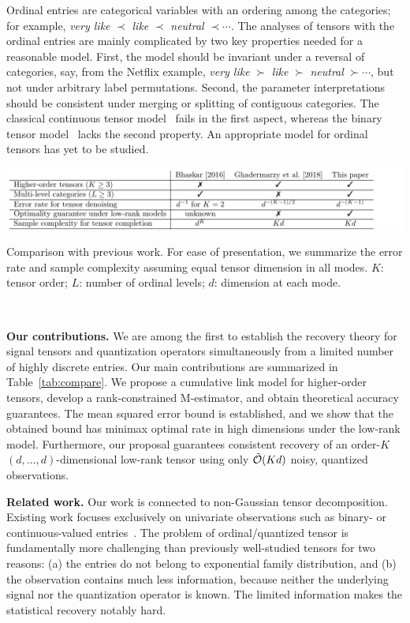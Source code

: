 \documentclass{article}
\theoremstyle{plain}
\theoremstyle{definition}
\begin{document}
Ordinal entries are categorical variables with an ordering among the categories; for example, {\it very like} $\prec$ {\it like} $\prec$ {\it neutral} $\prec \cdots$. The analyses of tensors with the ordinal entries are mainly complicated by two key properties needed for a reasonable model. First, the model should be invariant under a reversal of categories, say, from the Netflix example, {\it very like} $\succ$ {\it like} $\succ$ {\it neutral} $\succ \cdots$, but not under arbitrary label permutations. Second, the parameter interpretations should be consistent under merging or splitting of contiguous categories. The classical continuous tensor model~\cite{kolda2009tensor, ghadermarzy2019near} fails in the first aspect, whereas the binary tensor model~\cite{ghadermarzy2018learning} lacks the second property. An appropriate model for ordinal tensors has yet to be studied.

\begin{table}[ht]
\centerline{\includegraphics[width=1\textwidth]{compare.pdf}}
\vspace{-.3cm}
\caption{Comparison with previous work. For ease of presentation, we summarize the error rate and sample complexity assuming equal tensor dimension in all modes. $K$: tensor order; $L$: number of ordinal levels; $d$: dimension at each mode. }~\label{tab:compare}
\vspace{-.7cm}
\end{table}

{\bf Our contributions.} We are among the first to establish the recovery theory for signal tensors and quantization operators simultaneously from a limited number of highly discrete entries. Our main contributions are summarized in Table~\ref{tab:compare}. We propose a cumulative link model for higher-order tensors, develop a rank-constrained M-estimator, and obtain theoretical accuracy guarantees. The mean squared error bound is established, and we show that the obtained bound has minimax optimal rate in high dimensions under the low-rank model. Furthermore, our proposal guarantees consistent recovery of an order-$K$ $(d,\ldots,d)$-dimensional low-rank tensor using only $\tilde {\mathcal{O}}(Kd)$ noisy, quantized observations.

{\bf Related work.} Our work is connected to non-Gaussian tensor decomposition. Existing work focuses exclusively on univariate observations such as binary- or continuous-valued entries~\citep{hong2018generalized,ghadermarzy2018learning}.  The problem of ordinal/quantized tensor is fundamentally more challenging than previously well-studied tensors for two reasons: (a) the entries do not belong to exponential family distribution, and (b) the observation contains much less information, because neither the underlying signal nor the quantization operator is known. The limited information makes the statistical recovery notably hard.
\end{document}
